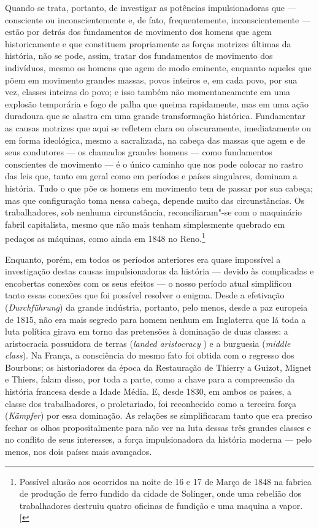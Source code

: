 Quando se trata, portanto, de investigar as potências impulsionadoras
que --- consciente ou inconscientemente e, de fato, frequentemente,
inconscientemente --- estão por detrás dos fundamentos de movimento dos
homens que agem historicamente e que constituem propriamente as forças
motrizes últimas da história, não se pode, assim, tratar dos fundamentos
de movimento dos indivíduos, mesmo os homens que agem de modo eminente,
enquanto aqueles que põem em movimento grandes massas, povos inteiros e,
em cada povo, por sua vez, classes inteiras do povo; e isso também não
momentaneamente em uma explosão temporária e fogo de palha que queima
rapidamente, mas em uma ação duradoura que se alastra em uma grande
transformação histórica. Fundamentar as causas motrizes que aqui se
refletem clara ou obscuramente, imediatamente ou em forma ideológica,
mesmo a sacralizada, na cabeça das massas que agem e de seus condutores
--- os chamados grandes homens --- como fundamentos conscientes de movimento
--- é o único caminho que nos pode colocar no rastro das leis que, tanto
em geral como em períodos e países singulares, dominam a história. Tudo
o que põe os homens em movimento tem de passar por sua cabeça; mas que
configuração toma nessa cabeça, depende muito das circunstâncias. Os
trabalhadores, sob nenhuma circunstância, reconciliaram"-se com o
maquinário fabril capitalista, mesmo que não mais tenham simplesmente
quebrado em pedaços as máquinas, como ainda em 1848 no Reno.\footnote{Possível alusão aos ocorridos na noite de 16 e 17 de Março de 1848 na
  fabrica de produção de ferro fundido da cidade de Solinger, onde uma
  rebelião dos trabalhadores destruiu quatro oficinas de fundição e uma
  maquina a vapor. {[}\versal{N.\,T.}{]}}

Enquanto, porém, em todos os períodos anteriores era quase impossível a
investigação destas causas impulsionadoras da história --- devido às
complicadas e encobertas conexões com os seus efeitos --- o nosso período
atual simplificou tanto essas conexões que foi possível resolver o
enigma. Desde a efetivação (\emph{Durchführung}) da grande indústria,
portanto, pelo menos, desde a paz europeia de 1815, não era mais segredo
para homem nenhum em Inglaterra que lá toda a luta política girava em
torno das pretensões à dominação de duas classes: a aristocracia
possuidora de terras (\emph{landed
aristocracy }) e a burguesia (\emph{middle
class}). Na França, a consciência do mesmo
fato foi obtida com o regresso dos Bourbons; os historiadores da época
da Restauração de Thierry a Guizot, Mignet e Thiers,
falam disso, por toda a parte, como a chave para a compreensão da
história francesa desde a Idade Média. E, desde 1830, em ambos os
países, a classe dos trabalhadores, o proletariado, foi reconhecido como
a terceira força (\emph{Kämpfer}) por essa dominação. As relações se
simplificaram tanto que era preciso fechar os olhos propositalmente para
não ver na luta dessas três grandes classes e no conflito de seus
interesses, a força impulsionadora da história moderna --- pelo menos, nos
dois países mais avançados.

